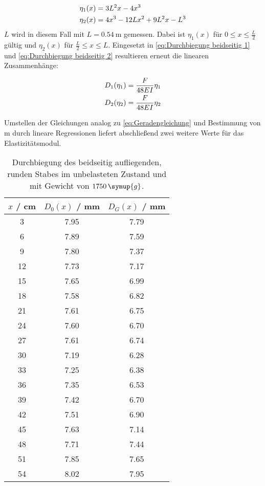 \begin{align}
  \eta_{1}(x)&=3L^{2}x-4x^{3}  \notag \\
  \eta_{2}(x)&=4x^{3}-12Lx^{2}+9L^{2}x-L^{3} \notag
\end{align}
$L$ wird in diesem Fall mit $L=\qty{0,54}{\metre}$ gemessen.
Dabei ist $\eta_{1}(x)$ für $0\leq x\leq \frac{L}{2}$ gültig und $\eta_{2}(x)$ für $\frac{L}{2}\leq x\leq L$.
Eingesetzt in \autoref{eq:Durchbiegung beidseitig 1} und \autoref{eq:Durchbiegung beidseitig 2}
resultieren erneut die linearen Zusammenhänge:

\begin{align}
  D_{1}(\eta_{1})=\frac{F}{48EI}\eta_{1} \notag \\
  D_{2}(\eta_{2})=\frac{F}{48EI}\eta_{2} \notag
\end{align}

Umstellen der Gleichungen analog zu \autoref{eq:Geradengleichung} und Bestimmung von m durch lineare Regressionen
liefert abschließend zwei weitere Werte für das Elastizitätsmodul.

\begin{table} [H]
  \centering
  \caption{Durchbiegung des beidseitig aufliegenden, runden Stabes im unbelasteten Zustand und mit Gewicht von $1750\,\symup{g}$.}
  \label{tab:rund beidseitig}
  \begin{tabular}{S[table-format=2.0] S[table-format=2.0] S[table-format=2.0]}
    \toprule
    {$x$ / cm} & {$D_{0}(x)$ / mm} & {$D_{G}(x)$ / mm } \\
     & 7.95 & 7.79 \\
     6 & 7.89 & 7.59 \\
     9 & 7.80 & 7.37 \\
    12 & 7.73 & 7.17 \\
    15 & 7.65 & 6.99 \\
    18 & 7.58 & 6.82 \\
    21 & 7.61 & 6.75 \\
    24 & 7.60 & 6.70 \\
    27 & 7.61 & 6.74 \\
    30 & 7.19 & 6.28 \\
    33 & 7.25 & 6.38 \\
    36 & 7.35 & 6.53 \\
    39 & 7.42 & 6.70 \\
    42 & 7.51 & 6.90 \\
    45 & 7.63 & 7.14 \\
    48 & 7.71 & 7.44 \\
    51 & 7.85 & 7.65 \\
    54 & 8.02 & 7.95 \\
    \bottomrule
  \end{tabular}
\end{table}

